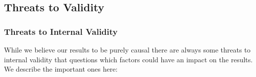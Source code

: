 
\subsection{Threats to Validity}


\subsubsection{Threats to Internal Validity} \mbox{}\par

While we believe our results to be purely causal there are always some threats to internal validity that questions which factors could have an impact on the results. We describe the important ones here:

